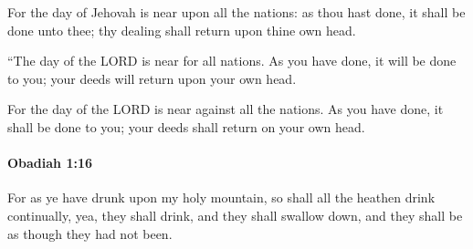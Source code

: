 			\begin{versebox}
					\item[BHS] 
					\item[LXX] 
					\item[ASV] For the day of Jehovah is near upon all the nations: as thou hast done, it shall be done unto thee; thy dealing shall return upon thine own head.
					\item[NIV] “The day of the LORD is near for all nations. As you have done, it will be done to you; your deeds will return upon your own head.
					\item[NRSV] For the day of the LORD is near against all the nations. As you have done, it shall be done to you; your deeds shall return on your own head.
			\end{versebox}

		\paragraph{Obadiah 1:16} %
			\label{OBADIAH-1-16}

			For as ye have drunk upon my holy mountain, so shall all the heathen drink continually, yea, they shall drink, and they shall swallow down, and they shall be as though they had not been.

